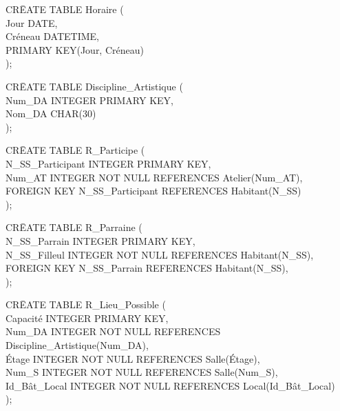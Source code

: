 \documentclass[a4paper,10.5pt]{report}
\begin{document}
		\begin{tabbing}
			CR\=EATE TABLE Horaire (\\
			\> Jour DATE,\\
			\> Créneau DATETIME,\\
			\> PRIMARY KEY(Jour, Créneau)\\);
		\end{tabbing}
		\begin{tabbing}
			CR\=EATE TABLE Discipline\_Artistique (\\
			\> Num\_DA INTEGER PRIMARY KEY,\\
			\> Nom\_DA CHAR(30)\\);
		\end{tabbing}
		\begin{tabbing}
			CR\=EATE TABLE R\_Participe (\\
			\> N\_SS\_Participant INTEGER PRIMARY KEY,\\			
			\> Num\_AT INTEGER NOT NULL REFERENCES Atelier(Num\_AT),\\
			\> FOREIGN KEY N\_SS\_Participant REFERENCES Habitant(N\_SS)\\);
		\end{tabbing}
		\begin{tabbing}
			CR\=EATE TABLE R\_Parraine (\\
			\> N\_SS\_Parrain INTEGER PRIMARY KEY, \\
			\> N\_SS\_Filleul INTEGER NOT NULL REFERENCES Habitant(N\_SS),\\
			\> FOREIGN KEY N\_SS\_Parrain REFERENCES Habitant(N\_SS),\\);
		\end{tabbing}
		\begin{tabbing}
			CR\=EATE TABLE R\_Lieu\_Possible (\\
			\> Capacité INTEGER PRIMARY KEY,\\
			\> Num\_DA INTEGER NOT NULL REFERENCES Discipline\_Artistique(Num\_DA),\\
			\> Étage INTEGER NOT NULL REFERENCES Salle(Étage),\\
			\> Num\_S INTEGER NOT NULL REFERENCES Salle(Num\_S),\\
			\> Id\_Bât\_Local INTEGER NOT NULL REFERENCES Local(Id\_Bât\_Local)\\);
		\end{tabbing}
\end{document}
